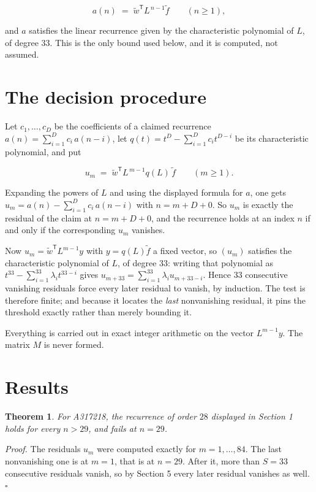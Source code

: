 \documentclass[11pt]{article}
\newtheorem{theorem}{Theorem}
\theoremstyle{definition}
\begin{document}
\[a(n) \;=\; \tilde w^{\mathsf T} L^{\,n-1} \tilde f \qquad (n \ge 1),\]

and $a$ satisfies the linear recurrence given by the characteristic polynomial of $L$, of degree $33$. This is the only bound used below, and it is computed, not assumed.

\section{The decision procedure}

Let $c_1,\dots,c_D$ be the coefficients of a claimed recurrence $a(n) = \sum_{i=1}^{D} c_i\,a(n-i)$, let $q(t) = t^{D} - \sum_{i=1}^{D} c_i t^{D-i}$ be its characteristic polynomial, and put

\[u_m \;=\; \tilde w^{\mathsf T} L^{\,m-1} q(L)\,\tilde f \qquad (m \ge 1).\]

Expanding the powers of $L$ and using the displayed formula for $a$, one gets $u_m = a(n) - \sum_{i=1}^{D} c_i\,a(n-i)$ with $n = m + D + 0$. So $u_m$ is exactly the residual of the claim at $n = m + D + 0$, and the recurrence holds at an index $n$ if and only if the corresponding $u_m$ vanishes.

Now $u_m = \tilde w^{\mathsf T} L^{m-1} y$ with $y = q(L)\tilde f$ a fixed vector, so $(u_m)$ satisfies the characteristic polynomial of $L$, of degree $33$: writing that polynomial as $t^{33} - \sum_{i=1}^{33} \lambda_i t^{33-i}$ gives $u_{m+33} = \sum_{i=1}^{33} \lambda_i u_{m+33-i}$. Hence $33$ consecutive vanishing residuals force every later residual to vanish, by induction. The test is therefore finite; and because it locates the {\itshape last} nonvanishing residual, it pins the threshold exactly rather than merely bounding it.

Everything is carried out in exact integer arithmetic on the vector $L^{m-1}y$. The matrix $M$ is never formed.

\section{Results}

\begin{theorem} For A317218, the recurrence of order $28$ displayed in Section 1 holds for every $n > 29$, and fails at $n = 29$.\end{theorem}

{\itshape Proof.} The residuals $u_m$ were computed exactly for $m = 1,\dots,84$. The last nonvanishing one is at $m = 1$, that is at $n = 29$. After it, more than $S = 33$ consecutive residuals vanish, so by Section 5 every later residual vanishes as well. $\square$
\end{document}

